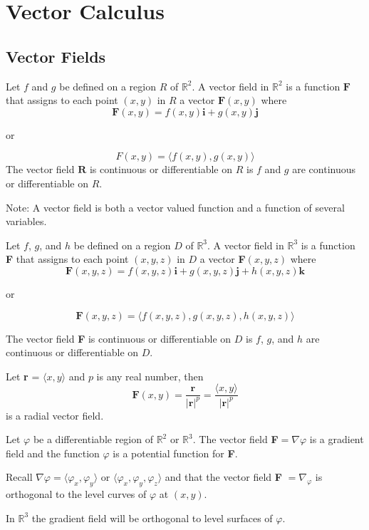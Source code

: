 \documentclass[../calc3.tex]{subfiles}
\begin{document}
\chapter{Vector Calculus}
\section{Vector Fields}
\begin{definition}
    Let $f$ and $g$ be defined on a region $R$ of $\mathbb{R}^2$.
    A vector field in $\mathbb{R}^2$ is a function $\textbf{F}$ that assigns to each 
    point $(x,y)$ in $R$ a vector $\textbf{F}(x,y)$ where 
    \[\textbf{F}(x,y) = f(x,y)\textbf{i}+g(x,y)\textbf{j}\]
    \begin{center}
    or
    \end{center}
    \[F(x,y)=\langle f(x,y), g(x,y) \rangle \]
    The vector field $\textbf{R}$ is continuous or differentiable on $R$ is $f$ 
    and $g$ are continuous or differentiable on $R$.

    Note: A vector field is both a vector valued function and a function of several variables. 
\end{definition}

\begin{definition}
    Let $f$, $g$, and $h$ be defined on a region $D$ of $\mathbb{R}^3$. A vector field in $\mathbb{R}^3$ is a function 
    \textbf{F} that assigns to each point $(x,y,z)$ in $D$ a vector \textbf{F}$(x,y,z)$ where 
    \[\textbf{F}(x,y,z)=f(x,y,z)\textbf{i}+g(x,y,z)\textbf{j}+h(x,y,z)\textbf{k}\]
    \begin{center}
        or
    \end{center}
    \[\textbf{F}(x,y,z)=\langle f(x,y,z), g(x,y,z), h(x,y,z)\rangle \]

    The vector field \textbf{F} is continuous or differentiable on $D$ is $f$, $g$, and $h$ are continuous or differentiable on $D$.
\end{definition}

\begin{definition}
    Let \textbf{r} = $\langle x,y\rangle$ and $p$ is any real number, then 
    \[\textbf{F}(x,y)=\frac{\textbf{r}}{|\textbf{r}|^p}=\frac{\langle x,y \rangle}{|\textbf{r}|^p}\]
    is a radial vector field.
\end{definition}
\pagebreak 
\begin{definition}
    Let $\varphi$ be a differentiable region of $\mathbb{R}^2$ or $\mathbb{R}^3$. The vector field \textbf{F}$=\nabla \varphi$ is a gradient field 
    and the function $\varphi$ is a potential function for \textbf{F}.

    Recall $\nabla \varphi = \langle \varphi_x, \varphi_y \rangle$ or $\langle \varphi_x, \varphi_y, \varphi_z\rangle$ 
    and that the vector field \textbf{F} $=\nabla_{\varphi}$ is orthogonal to the level curves of $\varphi$ at $(x,y)$.

    In $\mathbb{R}^3$ the gradient field will be orthogonal to level surfaces of $\varphi$.    
\end{definition}
\end{document}
